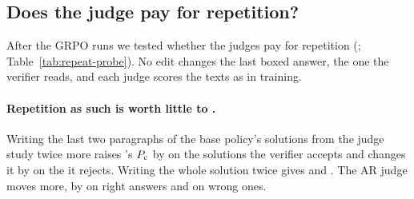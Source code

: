 \subsection{Does the judge pay for repetition?}\label{sec:res-repeat}

After the GRPO runs we tested whether the judges pay for repetition (;
Table~\ref{tab:repeat-probe}). No edit changes the last boxed answer, the one the verifier reads, and each judge scores
the texts as in training.

\paragraph{Repetition as such is worth little to \kev{}.} Writing the last two paragraphs of the base policy's solutions
from the judge study twice more raises \kev{}'s $P_{\mathrm{c}}$ by 
 on the  solutions the verifier accepts and changes it
by   on the  it rejects. Writing the
whole solution twice gives  and . The AR judge moves more, by
 on right answers and  on wrong ones.

